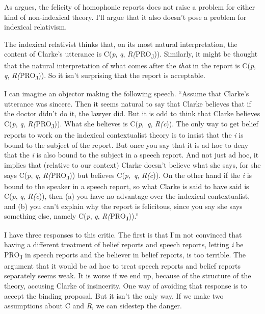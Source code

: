 As \citet{MacFarlane2009-MACNC} argues, the felicity of homophonic reports does not raise a problem for either kind of non-indexical theory. I'll argue that it also doesn't pose a problem for indexical relativism.

The indexical relativist thinks that, on its most natural interpretation, the content of Clarke's utterance is C(\textit{p}, \textit{q}, \textit{R(}PRO\textsubscript{J})). Similarly, it might be thought that the natural interpretation of what comes after the \textit{that} in the report is C(\textit{p}, \textit{q}, \textit{R(}PRO\textsubscript{J})). So it isn't surprising that the report is acceptable.

I can imagine an objector making the following speech. ``Assume that Clarke's utterance was sincere. Then it seems natural to say that Clarke believes that if the doctor didn't do it, the lawyer did. But it is odd to think that Clarke believes C(\textit{p}, \textit{q}, \textit{R(}PRO\textsubscript{J})). What she believes is C(\textit{p},~\textit{q}, \textit{R(c})). The only way to get belief reports to work on the indexical contextualist theory is to insist that the \textit{i} is bound to the subject of the report. But once you say that it is ad hoc to deny that the \textit{i} is also bound to the subject in a speech report. And not just ad hoc, it implies that (relative to our context) Clarke doesn't believe what she says, for she says C(\textit{p}, \textit{q}, \textit{R(}PRO\textsubscript{J})) but believes C(\textit{p},~\textit{q}, \textit{R(c})). On the other hand if the \textit{i} is bound to the speaker in a speech report, so what Clarke is said to have said is C(\textit{p}, \textit{q}, \textit{R(c})), then (a) you have no advantage over the indexical contextualist, and (b) you can't explain why the report is felicitous, since you say she says something else, namely C(\textit{p}, \textit{q}, \textit{R(}PRO\textsubscript{J})).''

I have three responses to this critic. The first is that I'm not convinced that having a different treatment of belief reports and speech reports, letting \textit{i} be PRO\textsubscript{J} in speech reports and the believer in belief reports, is too terrible. The argument that it would be ad hoc to treat speech reports and belief reports separately seems weak. It is worse if we end up, because of the structure of the theory, accusing Clarke of insincerity. One way of avoiding that response is to accept the binding proposal. But it isn't the only way. If we make two assumptions about C and \textit{R}, we can sidestep the danger. 

